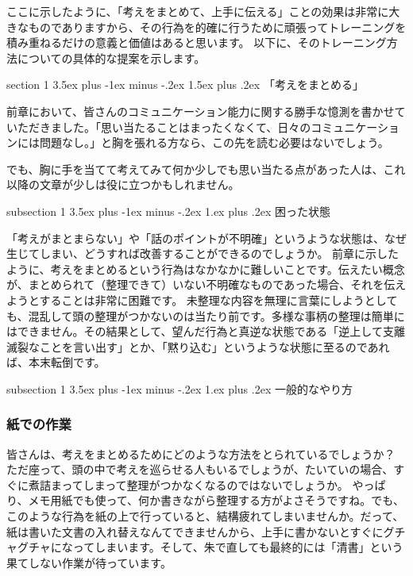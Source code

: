 \documentclass[12pt,a4paper]{jsarticle}
\makeatletter
\def\section{\@startsection 
{section}
{1}
{\z@}
{3.5ex plus -1ex minus -.2ex}
{1.5ex plus .2ex}
{\large\bf}
}
\def\subsection{\@startsection 
{subsection}
{1}
{\z@}
{3.5ex plus -1ex minus -.2ex}
{1.ex plus .2ex}
{\large\bf}
}
\makeatother
\begin{document}
ここに示したように、「考えをまとめて、上手に伝える」ことの効果は非常に大きなものでありますから、その行為を的確に行うために頑張ってトレーニングを積み重ねるだけの意義と価値はあると思います。
以下に、そのトレーニング方法についての具体的な提案を示します。

\section{「考えをまとめる」}

前章において、皆さんのコミュニケーション能力に関する勝手な憶測を書かせていただきました。「思い当たることはまったくなくて、日々のコミュニケーションには問題なし。」と胸を張れる方なら、この先を読む必要はないでしょう。

でも、胸に手を当てて考えてみて何か少しでも思い当たる点があった人は、これ以降の文章が少しは役に立つかもしれません。

\newpage


\subsection{困った状態}

「考えがまとまらない」や「話のポイントが不明確」というような状態は、なぜ生じてしまい、どうすれば改善することができるのでしょうか。
前章に示したように、考えをまとめるという行為はなかなかに難しいことです。伝えたい概念が、まとめられて（整理できて）いない不明確なものであった場合、それを伝えようとすることは非常に困難です。
未整理な内容を無理に言葉にしようとしても、混乱して頭の整理がつかないのは当たり前です。多様な事柄の整理は簡単にはできません。その結果として、望んだ行為と真逆な状態である「逆上して支離滅裂なことを言い出す」とか、「黙り込む」というような状態に至るのであれば、本末転倒です。

\subsection{一般的なやり方}

\subsubsection{紙での作業}

皆さんは、考えをまとめるためにどのような方法をとられているでしょうか？
ただ座って、頭の中で考えを巡らせる人もいるでしょうが、たいていの場合、すぐに煮詰まってしまって整理がつかなくなるのではないでしょうか。
やっぱり、メモ用紙でも使って、何か書きながら整理する方がよさそうですね。でも、このような行為を紙の上で行っていると、結構疲れてしまいませんか。だって、紙は書いた文書の入れ替えなんてできませんから、上手に書かないとすぐにグチャグチャになってしまいます。そして、朱で直しても最終的には「清書」という果てしない作業が待っています。
\end{document}
